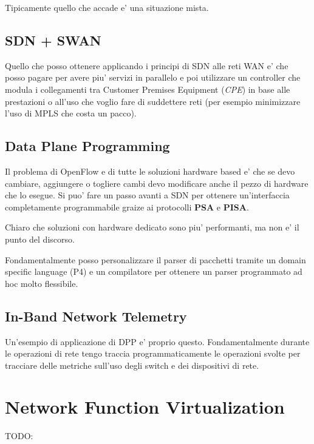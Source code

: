 
Tipicamente quello che accade e' una situazione mista.

\subsection{SDN + SWAN}

Quello che posso ottenere applicando i principi di SDN alle reti WAN e' che posso pagare per avere piu' servizi in parallelo e poi utilizzare un controller che modula i collegamenti tra Customer Premises Equipment (\textit{CPE}) in base alle prestazioni o all'uso che voglio fare di suddettere reti (per esempio minimizzare l'uso di MPLS che costa un pacco).


\subsection{Data Plane Programming}

Il problema di OpenFlow e di tutte le soluzioni hardware based e' che se devo cambiare, aggiungere o togliere cambi devo modificare anche il pezzo di hardware che lo esegue. Si puo' fare un passo avanti a SDN per ottenere un'interfaccia completamente programmabile graize ai protocolli \textbf{PSA} e \textbf{PISA}.

Chiaro che soluzioni con hardware dedicato sono piu' performanti, ma non e' il punto del discorso.


Fondamentalmente posso personalizzare il parser di pacchetti tramite un domain specific language (P4) e un compilatore per ottenere un parser programmato ad hoc molto flessibile.


\subsection{In-Band Network Telemetry}

Un'esempio di applicazione di DPP e' proprio questo.
Fondamentalmente durante le operazioni di rete tengo traccia programmaticamente le operazioni svolte per tracciare delle metriche sull'uso degli switch e dei dispositivi di rete.


\section{Network Function Virtualization}

TODO:
